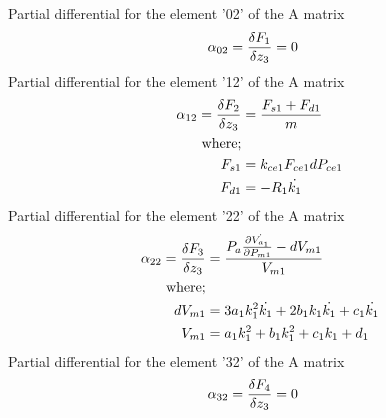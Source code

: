 \documentclass[11pt,a4paper]{article}
\begin{document}
\begin{appendices}
Partial differential for the element '02' of the A matrix\newline
\begin{align}
    \alpha_{02} = \fdv{F_1}{z_3} &= 0
\end{align}
Partial differential for the element '12' of the A matrix\newline
\begin{align}
    \alpha_{12} = \fdv{F_2}{z_3} &= \frac{F_{s1} + F_{d1}}{m}
    \label{math:alpha_12_matrix}\\
    \text{where;}\nonumber\\
    F_{s1} &= k_{ce1} F_{ce1} dP_{ce1}\nonumber\\
    F_{d1} &= -R_1 \dot{k_{1}}\nonumber
\end{align}
Partial differential for the element '22' of the A matrix\newline
\begin{align}
    \alpha_{22} = \fdv{F_3}{z_3} &= \frac{P_a \frac{\partial \dot{V_{a_1}}}{\partial P_{m1}} - dV_{m1}}{V_{m1}}
    \label{math:alpha_22_matrix}\\
    \text{where;}\nonumber\\
    dV_{m1} &= 3 a_1 k_{1}^2 \dot{k_{1}} + 2 b_1 k_{1} \dot{k_{1}} + c_1 \dot{k_{1}} \nonumber\\
    V_{m1}    &= a_1 k_{1}^2 + b_1 k_{1}^2 + c_1 k_{1} + d_1\nonumber
\end{align}
Partial differential for the element '32' of the A matrix\newline
\begin{align}
    \alpha_{32} = \fdv{F_4}{z_3} &= 0
\end{align}


\end{appendices}
\end{document}
